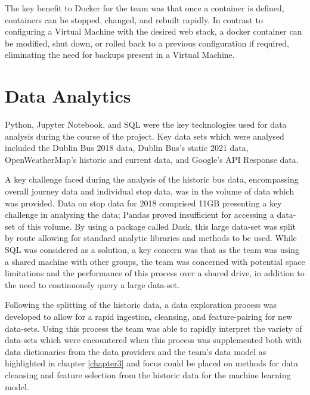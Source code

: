 \documentclass[]{UCD_CS_47360_Report}
\begin{document}
The key benefit to Docker for the team was that once a container is defined, containers can be stopped, changed, and rebuilt rapidly. In contrast to configuring a Virtual Machine with the desired web stack, a docker container can be modified, shut down, or rolled back to a previous configuration if required, eliminating the need for backups present in a Virtual Machine.
\newpage

\section{Data Analytics}\label{DA}
Python, Jupyter Notebook, and SQL were the key technologies used for data analysis during the course of the project. Key data sets which were analysed included the Dublin Bus 2018 data, Dublin Bus's static 2021 data, OpenWeatherMap's historic and current data, and Google's API Response data.

A key challenge faced during the analysis of the historic bus data, encompassing overall journey data and individual stop data, was in the volume of data which was provided. Data on stop data for 2018 comprised 11GB presenting a key challenge in analysing the data; Pandas proved insufficient for accessing a data-set of this volume. By using a package called Dask, this large data-set was split by route allowing for standard analytic libraries and methods to be used. While SQL was considered as a solution, a key concern was that as the team was using a shared machine with other groups, the team was concerned with potential space limitations and the performance of this process over a shared drive, in addition to the need to continuously query a large data-set.

Following the splitting of the historic data, a data exploration process was developed to allow for a rapid ingestion, cleansing, and feature-pairing for new data-sets. Using this process the team was able to rapidly interpret the variety of data-sets which were encountered when this process was supplemented both with data dictionaries from the data providers and the team's data model as highlighted in chapter \ref{chapter3} and focus could be placed on methods for data cleansing and feature selection from the historic data for the machine learning model.
\end{document}
